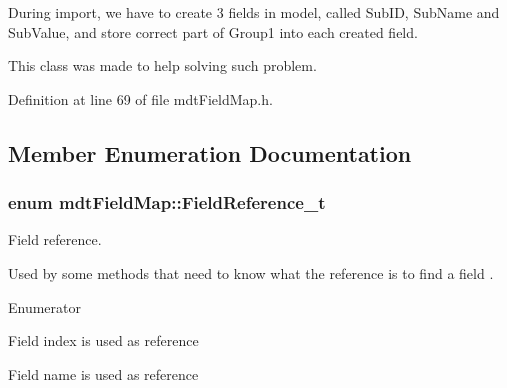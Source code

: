 During import, we have to create 3 fields in model, called Sub\-I\-D, Sub\-Name and Sub\-Value, and store correct part of Group1 into each created field.

This class was made to help solving such problem. 

Definition at line 69 of file mdt\-Field\-Map.\-h.



\subsection{Member Enumeration Documentation}
\hypertarget{classmdt_field_map_a8a8dd62273d396d926bf3df837407392}{
\subsubsection[{Field\-Reference\-\_\-t}]{\setlength{\rightskip}{0pt plus 5cm}enum {\bf mdt\-Field\-Map\-::\-Field\-Reference\-\_\-t}}}\label{classmdt_field_map_a8a8dd62273d396d926bf3df837407392}


Field reference. 

Used by some methods that need to know what the reference is to find a field . \begin{Desc}
\item[Enumerator]\par
\begin{description}
\item[{\em 
\hypertarget{classmdt_field_map_a8a8dd62273d396d926bf3df837407392a97087465cf8e740359c63ded60db38e6}{Reference\-By\-Index}\label{classmdt_field_map_a8a8dd62273d396d926bf3df837407392a97087465cf8e740359c63ded60db38e6}
}]Field index is used as reference \item[{\em 
\hypertarget{classmdt_field_map_a8a8dd62273d396d926bf3df837407392a1e9f34c9b214c691edc9d0ed7f7056a1}{Reference\-By\-Name}\label{classmdt_field_map_a8a8dd62273d396d926bf3df837407392a1e9f34c9b214c691edc9d0ed7f7056a1}
}]Field name is used as reference \end{description}
\end{Desc}



